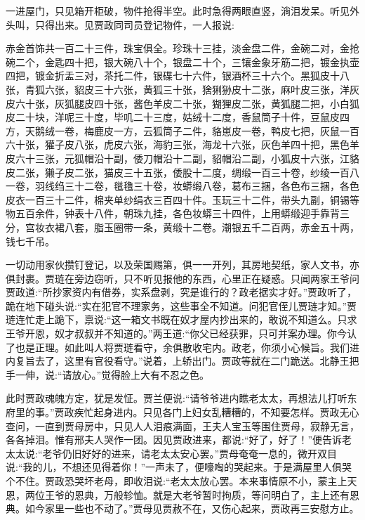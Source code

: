 \begin{parag}
    一进屋门，只见箱开柜破，物件抢得半空。此时急得两眼直竖，淌泪发呆。听见外头叫，只得出来。见贾政同司员登记物件，一人报说:
\end{parag}


\begin{qute2sp}
    赤金首饰共一百二十三件，珠宝俱全。珍珠十三挂，淡金盘二件，金碗二对，金抢碗二个，金匙四十把，银大碗八十个，银盘二十个，三镶金象牙筋二把，镀金执壶四把，镀金折盂三对，茶托二件，银碟七十六件，银酒杯三十六个。黑狐皮十八张，青狐六张，貂皮三十六张，黄狐三十张，猞猁狲皮十二张，麻叶皮三张，洋灰皮六十张，灰狐腿皮四十张，酱色羊皮二十张，猢狸皮二张，黄狐腿二把，小白狐皮二十块，洋呢三十度，毕叽二十三度，姑绒十二度，香鼠筒子十件，豆鼠皮四方，天鹅绒一卷，梅鹿皮一方，云狐筒子二件，貉崽皮一卷，鸭皮七把，灰鼠一百六十张，獾子皮八张，虎皮六张，海豹三张，海龙十六张，灰色羊四十把，黑色羊皮六十三张，元狐帽沿十副，倭刀帽沿十二副，貂帽沿二副，小狐皮十六张，江貉皮二张，獭子皮二张，猫皮三十五张，倭股十二度，绸缎一百三十卷，纱绫一百八一卷，羽线绉三十二卷，氆氇三十卷，妆蟒缎八卷，葛布三捆，各色布三捆，各色皮衣一百三十二件，棉夹单纱绢衣三百四十件。玉玩三十二件，带头九副，铜锡等物五百余件，钟表十八件，朝珠九挂，各色妆蟒三十四件，上用蟒缎迎手靠背三分，宫妆衣裙八套，脂玉圈带一条，黄缎十二卷。潮银五千二百两，赤金五十两，钱七千吊。
\end{qute2sp}


\begin{parag}
    一切动用家伙攒钉登记，以及荣国赐第，俱一一开列，其房地契纸，家人文书，亦俱封裹。贾琏在旁边窃听，只不听见报他的东西，心里正在疑惑。只闻两家王爷问贾政道:“所抄家资内有借券，实系盘剥，究是谁行的？政老据实才好。”贾政听了，跪在地下碰头说:“实在犯官不理家务，这些事全不知道。问犯官侄儿贾琏才知。”贾琏连忙走上跪下，禀说:“这一箱文书既在奴才屋内抄出来的，敢说不知道么。只求王爷开恩，奴才叔叔并不知道的。”两王道:“你父已经获罪，只可并案办理。你今认了也是正理。如此叫人将贾琏看守，余俱散收宅内。政老，你须小心候旨。我们进内复旨去了，这里有官役看守。”说着，上轿出门。贾政等就在二门跪送。北静王把手一伸，说:“请放心。”觉得脸上大有不忍之色。
\end{parag}


\begin{parag}
    此时贾政魂魄方定，犹是发怔。贾兰便说:“请爷爷进内瞧老太太，再想法儿打听东府里的事。”贾政疾忙起身进内。只见各门上妇女乱糟糟的，不知要怎样。贾政无心查问，一直到贾母房中，只见人人泪痕满面，王夫人宝玉等围住贾母，寂静无言，各各掉泪。惟有邢夫人哭作一团。因见贾政进来，都说:“好了，好了！”便告诉老太太说:“老爷仍旧好好的进来，请老太太安心罢。”贾母奄奄一息的，微开双目说:“我的儿，不想还见得着你！”一声未了，便嚎啕的哭起来。于是满屋里人俱哭个不住。贾政恐哭坏老母，即收泪说:“老太太放心罢。本来事情原不小，蒙主上天恩，两位王爷的恩典，万般轸恤。就是大老爷暂时拘质，等问明白了，主上还有恩典。如今家里一些也不动了。”贾母见贾赦不在，又伤心起来，贾政再三安慰方止。
\end{parag}


